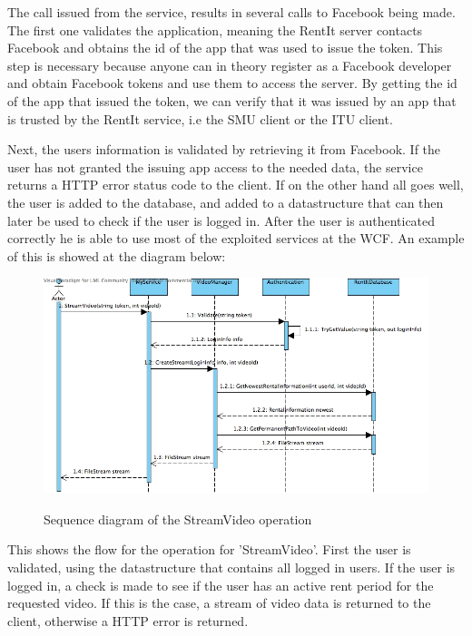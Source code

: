 The call issued from the service, results in several calls to Facebook being made. The first one validates the application, meaning the RentIt server contacts Facebook and obtains the id of the app that was used to issue the token. This step is necessary because anyone can in theory register as a Facebook developer and obtain Facebook tokens and use them to access the server. By getting the id of the app that issued the token, we can verify that it was issued by an app that is trusted by the RentIt service, i.e the SMU client or the ITU client.

Next, the users information is validated by retrieving it from Facebook. If the user has not granted the issuing app access to the needed data, the service returns a HTTP error status code to the client. If on the other hand all goes well, the user is added to the database, and added to a datastructure that can then later be used to check if the user is logged in.
After the user is authenticated correctly he is able to use most of the exploited services at the WCF. An example of this is showed at the diagram below:

\begin{figure}[H]
\centering
\includegraphics[scale=0.35]{StreamVideo.jpg}
\label{streamvideo}
\caption{Sequence diagram of the StreamVideo operation}
\end{figure}

This shows the flow for the operation for 'StreamVideo'. First the user is validated, using the datastructure that contains all logged in users. If the user is logged in, a check is made to see if the user has an active rent period for the requested video. If this is the case, a stream of video data is returned to the client, otherwise a HTTP error is returned.
